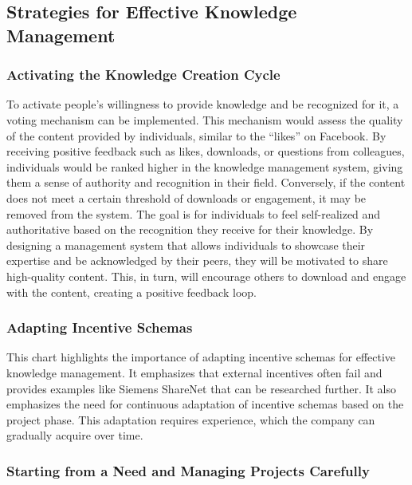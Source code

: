 \subsection{Strategies for Effective Knowledge
  Management}\label{strategies-for-effective-knowledge-management}

\subsubsection{Activating the Knowledge Creation
  Cycle}\label{activating-the-knowledge-creation-cycle}

To activate people's willingness to provide knowledge and be recognized
for it, a voting mechanism can be implemented. This mechanism would
assess the quality of the content provided by individuals, similar to
the ``likes'' on Facebook. By receiving positive feedback such as likes,
downloads, or questions from colleagues, individuals would be ranked
higher in the knowledge management system, giving them a sense of
authority and recognition in their field. Conversely, if the content
does not meet a certain threshold of downloads or engagement, it may be
removed from the system. The goal is for individuals to feel
self-realized and authoritative based on the recognition they receive
for their knowledge. By designing a management system that allows
individuals to showcase their expertise and be acknowledged by their
peers, they will be motivated to share high-quality content. This, in
turn, will encourage others to download and engage with the content,
creating a positive feedback loop.

\subsubsection{Adapting Incentive
  Schemas}\label{adapting-incentive-schemas}

This chart highlights the importance of adapting incentive schemas for
effective knowledge management. It emphasizes that external incentives
often fail and provides examples like Siemens ShareNet that can be
researched further. It also emphasizes the need for continuous
adaptation of incentive schemas based on the project phase. This
adaptation requires experience, which the company can gradually acquire
over time.

\subsubsection{Starting from a Need and Managing Projects
  Carefully}\label{starting-from-a-need-and-managing-projects-carefully}

